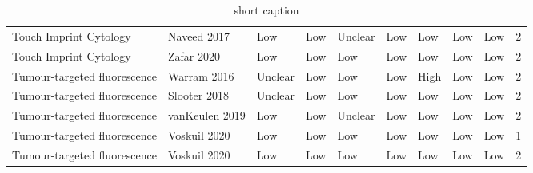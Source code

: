 \begin{table}[ht]
\begin{tabular}{llllllllll}
  Touch Imprint Cytology & Naveed 2017 & Low & Low & Unclear & Low & Low & Low & Low & 2 \\ 
  Touch Imprint Cytology & Zafar 2020 & Low & Low & Low & Low & Low & Low & Low & 2 \\ 
  Tumour-targeted fluorescence & Warram 2016 & Unclear & Low & Low & Low & High & Low & Low & 2 \\ 
  Tumour-targeted fluorescence & Slooter 2018 & Unclear & Low & Low & Low & Low & Low & Low & 2 \\ 
  Tumour-targeted fluorescence & vanKeulen 2019 & Low & Low & Unclear & Low & Low & Low & Low & 2 \\ 
  Tumour-targeted fluorescence & Voskuil 2020 & Low & Low & Low & Low & Low & Low & Low & 1 \\ 
  Tumour-targeted fluorescence & Voskuil 2020 & Low & Low & Low & Low & Low & Low & Low & 2 \\ 
   \hline
\end{tabular}
\endgroup
\caption[full caption]{short caption} 
\label{tab:qual_scores}
\end{table}
